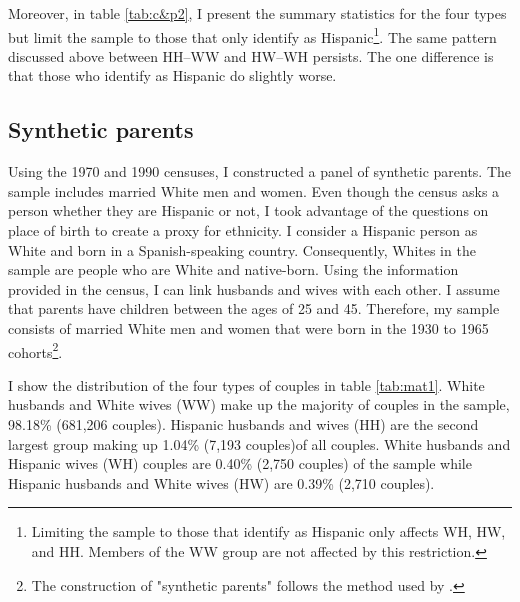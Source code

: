 \documentclass{wptemp}
\begin{document}
Moreover, in table \ref{tab:c&p2}, I present the summary statistics for the four types but limit the sample to those that only identify as Hispanic\footnote{Limiting the sample to those that identify as Hispanic only affects WH, HW, and HH. Members of the WW group are not affected by this restriction.}. The same pattern discussed above between HH--WW and HW--WH persists. The one difference is that those who identify as Hispanic do slightly worse.
 
\subsection{Synthetic parents}

Using the 1970 and 1990 censuses, I constructed a panel of synthetic parents. The sample includes married White men and women. Even though the census asks a person whether they are Hispanic or not, I took advantage of the questions on place of birth to create a proxy for ethnicity. I consider a Hispanic person as White and born in a Spanish-speaking country. Consequently, Whites in the sample are people who are White and native-born. Using the information provided in the census, I can link husbands and wives with each other. I assume that parents have children between the ages of 25 and 45. Therefore, my sample consists of married White men and women that were born in the 1930 to 1965 cohorts\footnote{The construction of "synthetic parents" follows the method used by \citet{rubinstein2014pride}.}.

I show the distribution of the four types of couples in table \ref{tab:mat1}. White husbands and White wives (WW) make up the majority of couples in the sample, 98.18\% (681,206 couples). Hispanic husbands and wives (HH) are the second largest group making up 1.04\% (7,193 couples)of all couples. White husbands and Hispanic wives (WH) couples are 0.40\% (2,750 couples) of the sample while Hispanic husbands and White wives (HW) are 0.39\% (2,710 couples). 
\end{document}
